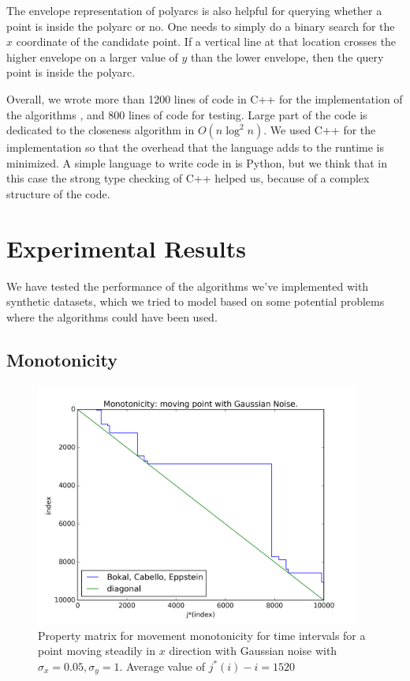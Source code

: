 \documentclass{article}
\begin{document}
The envelope representation of polyarcs is also helpful for querying
whether a point is inside the polyarc or no. One needs to simply
do a binary search for the $x$ coordinate of the candidate point.
If a vertical line at that location crosses the higher envelope on
a larger value of $y$ than the lower envelope, then the query point
is inside the polyarc.

Overall, we wrote more than 1200 lines of code in C++ for the
implementation of the algorithms \cite{report_code}, and 800 lines
of code for testing. Large part of the code is dedicated to the
closeness algorithm in $O(n \log^2 n)$. We used C++ for the
implementation so that the overhead that the language adds to the
runtime is minimized. A simple language to write code in is Python,
but we think that in this case the strong type checking of C++
helped us, because of a complex structure of the code.

\section{Experimental Results}
\label{sec:experiments}
We have tested the performance of the algorithms we've implemented
with synthetic datasets, which we tried to model based on some
potential problems where the algorithms could have been used.

\subsection{Monotonicity}
\label{sec:experiments:monotonicity}

\begin{figure}[!ht]
  \centering
  \includegraphics[height=8cm]{../plots/monotonicity_moving_gaussian}
  \caption{Property matrix for movement monotonicity for time intervals for a point moving steadily in $x$ direction with Gaussian noise with $\sigma_x = 0.05, \sigma_y = 1$. Average value of $j^*(i) - i = 1520$}
  \label{fig:monotonicity_demo}
\end{figure}
\end{document}

